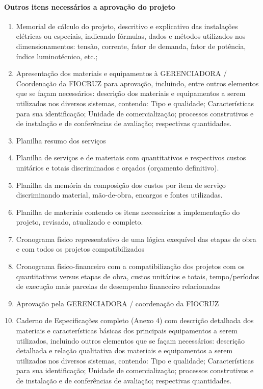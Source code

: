 \paragraph{Outros itens necessários a aprovação do projeto}
\begin{enumerate}
	\item Memorial de cálculo do projeto, descritivo e explicativo das instalações elétricas ou especiais, indicando fórmulas, dados e métodos utilizados nos dimensionamentos: tensão, corrente, fator de demanda, fator de potência, índice luminotécnico, etc.;

	\item Apresentação dos materiais e equipamentos à GERENCIADORA / Coordenação da FIOCRUZ para aprovação, incluindo, entre outros elementos que se façam necessários: descrição dos materiais e equipamentos a serem utilizados nos diversos sistemas, contendo: Tipo e qualidade; Características para sua identificação; Unidade de comercialização; processos construtivos e de instalação e de conferências de avaliação; respectivas quantidades.

	\item Planilha resumo dos serviços

	\item Planilha de serviços e de materiais com quantitativos e respectivos custos unitários e totais discriminados e orçados (orçamento definitivo).

	\item Planilha da memória da composição dos custos por item de serviço discriminando material, mão-de-obra, encargos e fontes utilizadas.

	\item Planilha de materiais contendo os itens necessários a implementação do projeto, revisado, atualizado e completo.

	\item Cronograma físico representativo de uma lógica exequível das etapas de obra e com todos os projetos compatibilizados

	\item Cronograma físico-financeiro com a compatibilização dos projetos com os quantitativos versus etapas de obra, custos unitários e totais, tempo/períodos de execução mais parcelas de desempenho financeiro relacionadas

	\item Aprovação pela GERENCIADORA / coordenação da FIOCRUZ

	\item Caderno de Especificações completo (Anexo 4) com descrição detalhada dos materiais e características básicas dos principais equipamentos a serem utilizados, incluindo outros elementos que se façam necessários: descrição detalhada e relação qualitativa dos materiais e equipamentos a serem utilizados nos diversos sistemas, contendo: Tipo e qualidade; Características para sua identificação; Unidade de comercialização; processos construtivos e de instalação e de conferências de avaliação; respectivas quantidades.


\end{enumerate}
